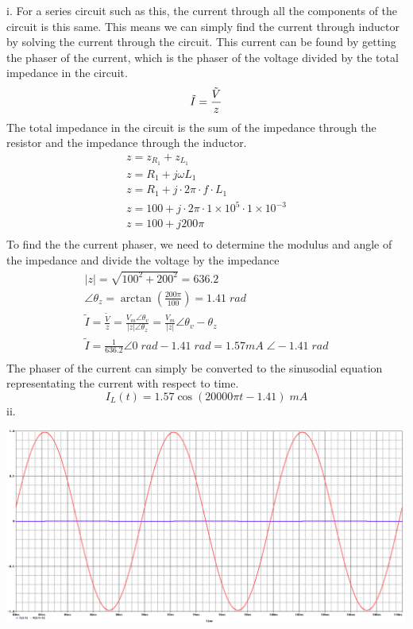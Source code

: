 \documentclass[12pt]{article}
\begin{document}
\thispagestyle{prelabheader}
i.
For a series circuit such as this, the current through all the components of the circuit is this same. This means we can simply find the current through inductor by solving the current through the circuit. This current can be found by getting the phaser of the current, which is the phaser of the voltage divided by the total impedance in the circuit.
\[
    \tilde{I} = \frac{\tilde{V}}{z} \\
\]
The total impedance in the circuit is the sum of the impedance through the resistor and the impedance through the inductor.
\[
\begin{gathered}
    z = z_{R_1} + z_{L_1} \\
    z = R_1 + j\omega L_1 \\
    z = R_1 + j\cdot2\pi\cdot f\cdot L_1\\
    z  = 100 + j\cdot 2\pi \cdot 1\times10^5 \cdot 1\times10^{-3} \\
    z = 100 + j200\pi \\
\end{gathered}
\]
To find the the current phaser, we need to determine the modulus and angle of the impedance and divide the voltage by the impedance 
\[
\begin{gathered}
    \left|z\right| = \sqrt{100^2 + 200^2} = 636.2\\
    \angle \theta_z = \arctan(\frac{200\pi}{100}) = 1.41\; rad \\
    \tilde{I} = \frac{\tilde{V}}{z} = \frac{V_m\angle \theta_v}{\left|z\right| \angle \theta_z} = \frac{V_m}{\left|z\right|} \angle \theta_v - \theta_z \\
    \tilde{I} = \frac{1}{636.2} \angle 0\;rad - 1.41\;rad = 1.57mA\; \angle -1.41\; rad \\
\end{gathered}
\]
The phaser of the current can simply be converted to the sinusodial equation representating the current with respect to time.
\[
    I_L(t) = 1.57\cos(20000\pi t - 1.41)\; mA
\]
\restoregeometry
\clearpage
ii.
\begin{center}
    \includegraphics[width=\textwidth]{q2.PNG}
\end{center}
\end{document}
